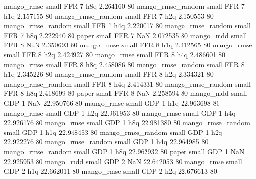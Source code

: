        mango_rmse      small      FFR                 7                  h8q  2.264160 80
mango_rmse_random      small      FFR                 7                  h1q  2.157155 80
mango_rmse_random      small      FFR                 7                  h2q  2.150553 80
mango_rmse_random      small      FFR                 7                  h4q  2.220017 80
mango_rmse_random      small      FFR                 7                  h8q  2.222940 80
            paper      small      FFR                 7                  NaN  2.072535 80
        mango_mdd      small      FFR                 8                  NaN  2.350693 80
       mango_rmse      small      FFR                 8                  h1q  2.412565 80
       mango_rmse      small      FFR                 8                  h2q  2.424927 80
       mango_rmse      small      FFR                 8                  h4q  2.486601 80
       mango_rmse      small      FFR                 8                  h8q  2.458086 80
mango_rmse_random      small      FFR                 8                  h1q  2.345226 80
mango_rmse_random      small      FFR                 8                  h2q  2.334321 80
mango_rmse_random      small      FFR                 8                  h4q  2.414331 80
mango_rmse_random      small      FFR                 8                  h8q  2.418699 80
            paper      small      FFR                 8                  NaN  2.258594 80
        mango_mdd      small      GDP                 1                  NaN 22.950766 80
       mango_rmse      small      GDP                 1                  h1q 22.963698 80
       mango_rmse      small      GDP                 1                  h2q 22.961953 80
       mango_rmse      small      GDP                 1                  h4q 22.926176 80
       mango_rmse      small      GDP                 1                  h8q 22.981380 80
mango_rmse_random      small      GDP                 1                  h1q 22.948453 80
mango_rmse_random      small      GDP                 1                  h2q 22.922276 80
mango_rmse_random      small      GDP                 1                  h4q 22.964985 80
mango_rmse_random      small      GDP                 1                  h8q 22.962932 80
            paper      small      GDP                 1                  NaN 22.925953 80
        mango_mdd      small      GDP                 2                  NaN 22.642053 80
       mango_rmse      small      GDP                 2                  h1q 22.662011 80
       mango_rmse      small      GDP                 2                  h2q 22.676613 80
